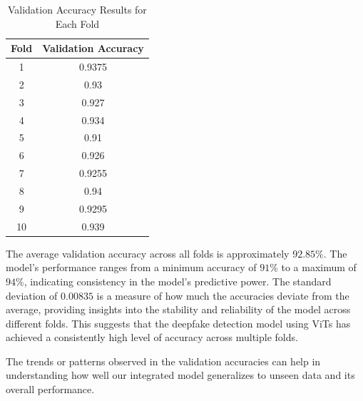 \begin{table}[ht]
    \centering
    \renewcommand{\arraystretch}{1.5}
    \begin{tabular}{|c|c|}
        \hline
        \textbf{Fold} & \textbf{Validation Accuracy} \\
        \hline
        1             & 0.9375                       \\
        \hline
        2             & 0.93                         \\
        \hline
        3             & 0.927                        \\
        \hline
        4             & 0.934                        \\
        \hline
        5             & 0.91                         \\
        \hline
        6             & 0.926                        \\
        \hline
        7             & 0.9255                       \\
        \hline
        8             & 0.94                         \\
        \hline
        9             & 0.9295                       \\
        \hline
        10            & 0.939                        \\
        \hline
    \end{tabular}
    \caption{Validation Accuracy Results for Each Fold}
    \label{tab:kfold_results}
\end{table}

\noindent The average validation accuracy across all folds is approximately \(92.85\%\). The model's performance ranges from a minimum accuracy of \(91\%\) to a maximum of \(94\%\), indicating consistency in the model's predictive power. The standard deviation of \(0.00835\) is a measure of how much the accuracies deviate from the average, providing insights into the stability and reliability of the model across different folds. This suggests that the deepfake detection model using ViTs has achieved a consistently high level of accuracy across multiple folds.

\noindent The trends or patterns observed in the validation accuracies can help in understanding how well our integrated model generalizes to unseen data and its overall performance.


\newpage
